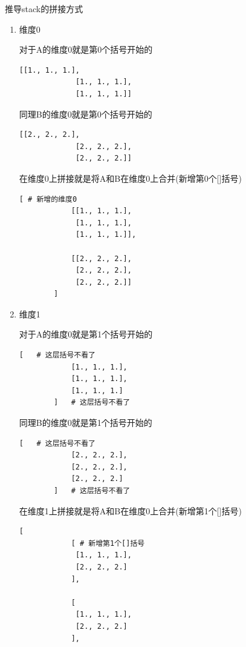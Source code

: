 \begin{derivation}{推导stack的拼接方式}
    \begin{enumerate}[label=\arabic*)]
        \item 维度0

        对于A的维度0就是第0个括号开始的
        \begin{lstlisting}[style=demostyle,numbers=none]
            [[1., 1., 1.],
             [1., 1., 1.],
             [1., 1., 1.]]
        \end{lstlisting}   
            
        同理B的维度0就是第0个括号开始的
        \begin{lstlisting}[style=demostyle,numbers=none]
            [[2., 2., 2.],
             [2., 2., 2.],
             [2., 2., 2.]]
        \end{lstlisting}

        在维度0上拼接就是将A和B在维度0上合并(新增第0个[]括号)
        \begin{lstlisting}[style=demostyle,numbers=none]
        [ # 新增的维度0
            [[1., 1., 1.],
             [1., 1., 1.],
             [1., 1., 1.]],

            [[2., 2., 2.],
             [2., 2., 2.],
             [2., 2., 2.]]
        ]
        \end{lstlisting}

        \item 维度1

        对于A的维度0就是第1个括号开始的
        \begin{lstlisting}[style=demostyle,numbers=none]
        [   # 这层括号不看了
            [1., 1., 1.],
            [1., 1., 1.],
            [1., 1., 1.]
        ]   # 这层括号不看了
        \end{lstlisting}

        同理B的维度0就是第1个括号开始的
        \begin{lstlisting}[style=demostyle,numbers=none]
        [   # 这层括号不看了
            [2., 2., 2.],
            [2., 2., 2.],
            [2., 2., 2.]
        ]   # 这层括号不看了
        \end{lstlisting}

        在维度1上拼接就是将A和B在维度0上合并(新增第1个[]括号)
        \begin{lstlisting}[style=demostyle,numbers=none]
        [
            [ # 新增第1个[]括号
             [1., 1., 1.],
             [2., 2., 2.]
            ],
   
            [
             [1., 1., 1.],
             [2., 2., 2.]
            ],
   

\end{lstlisting}
\end{enumerate}
\end{derivation}
